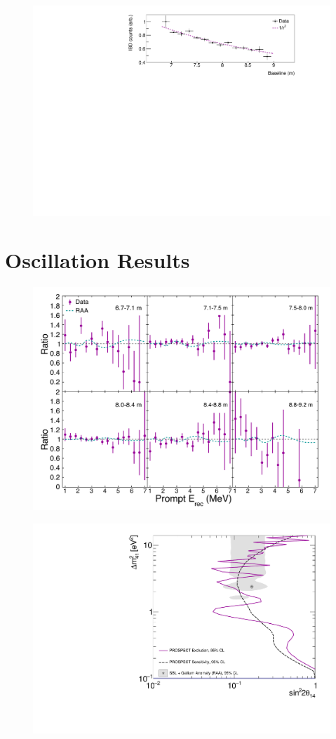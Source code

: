 \begin{figure}[H]
	\centering
	\includegraphics[width=0.7\linewidth]{tex/7-oscillation-images/IBDvsBaseline}
	\caption{}
	\label{fig:ibdvsbaseline}
\end{figure}



\section{Oscillation Results}

\begin{figure}[H]
	\centering
	\includegraphics[width=0.7\linewidth]{tex/7-oscillation-images/BaselineSpectra}
	\caption{}
	\label{fig:baselinespectra}
\end{figure}

\begin{figure}[H]
	\centering
	\includegraphics[width=0.7\linewidth]{tex/7-oscillation-images/Exclusion_Sensitivity_Final}
	\caption{}
	\label{fig:exclusionsensitivityfinal}
\end{figure}



